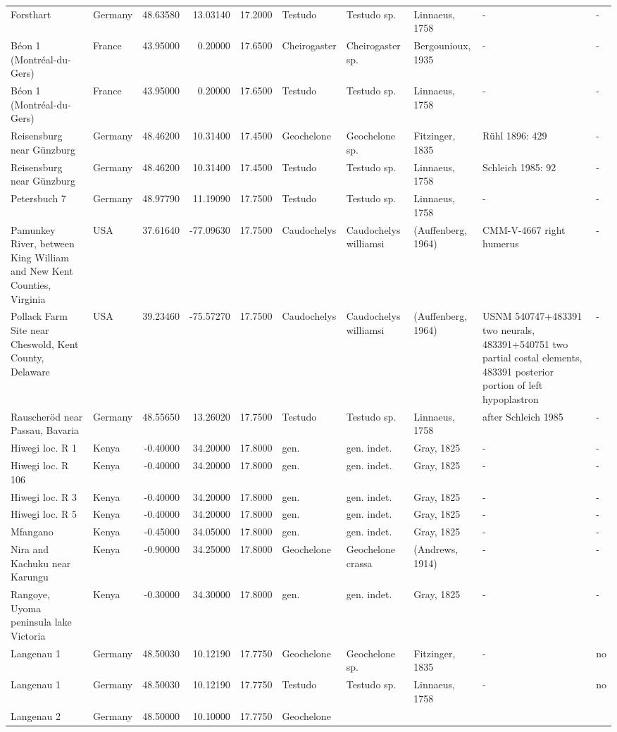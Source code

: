 \documentclass[]{article}
\begin{document}
\begin{longtable}[]{@{}llrrrlllll@{}}
Forsthart & Germany & 48.63580 & 13.03140 & 17.2000 & Testudo & Testudo
sp. & Linnaeus, 1758 & - & -\tabularnewline
Béon 1 (Montréal-du-Gers) & France & 43.95000 & 0.20000 & 17.6500 &
Cheirogaster & Cheirogaster sp. & Bergounioux, 1935 & - &
-\tabularnewline
Béon 1 (Montréal-du-Gers) & France & 43.95000 & 0.20000 & 17.6500 &
Testudo & Testudo sp. & Linnaeus, 1758 & - & -\tabularnewline
Reisensburg near Günzburg & Germany & 48.46200 & 10.31400 & 17.4500 &
Geochelone & Geochelone sp. & Fitzinger, 1835 & Rühl 1896: 429 &
-\tabularnewline
Reisensburg near Günzburg & Germany & 48.46200 & 10.31400 & 17.4500 &
Testudo & Testudo sp. & Linnaeus, 1758 & Schleich 1985: 92 &
-\tabularnewline
Petersbuch 7 & Germany & 48.97790 & 11.19090 & 17.7500 & Testudo &
Testudo sp. & Linnaeus, 1758 & - & -\tabularnewline
Pamunkey River, between King William and New Kent Counties, Virginia &
USA & 37.61640 & -77.09630 & 17.7500 & Caudochelys & Caudochelys
williamsi & (Auffenberg, 1964) & CMM-V-4667 right humerus &
-\tabularnewline
Pollack Farm Site near Cheswold, Kent County, Delaware & USA & 39.23460
& -75.57270 & 17.7500 & Caudochelys & Caudochelys williamsi &
(Auffenberg, 1964) & USNM 540747+483391 two neurals, 483391+540751 two
partial costal elements, 483391 posterior portion of left hypoplastron &
-\tabularnewline
Rauscheröd near Passau, Bavaria & Germany & 48.55650 & 13.26020 &
17.7500 & Testudo & Testudo sp. & Linnaeus, 1758 & after Schleich 1985 &
-\tabularnewline
Hiwegi loc. R 1 & Kenya & -0.40000 & 34.20000 & 17.8000 & gen. & gen.
indet. & Gray, 1825 & - & -\tabularnewline
Hiwegi loc. R 106 & Kenya & -0.40000 & 34.20000 & 17.8000 & gen. & gen.
indet. & Gray, 1825 & - & -\tabularnewline
Hiwegi loc. R 3 & Kenya & -0.40000 & 34.20000 & 17.8000 & gen. & gen.
indet. & Gray, 1825 & - & -\tabularnewline
Hiwegi loc. R 5 & Kenya & -0.40000 & 34.20000 & 17.8000 & gen. & gen.
indet. & Gray, 1825 & - & -\tabularnewline
Mfangano & Kenya & -0.45000 & 34.05000 & 17.8000 & gen. & gen. indet. &
Gray, 1825 & - & -\tabularnewline
Nira and Kachuku near Karungu & Kenya & -0.90000 & 34.25000 & 17.8000 &
Geochelone & Geochelone crassa & (Andrews, 1914) & - & -\tabularnewline
Rangoye, Uyoma peninsula lake Victoria & Kenya & -0.30000 & 34.30000 &
17.8000 & gen. & gen. indet. & Gray, 1825 & - & -\tabularnewline
Langenau 1 & Germany & 48.50030 & 10.12190 & 17.7750 & Geochelone &
Geochelone sp. & Fitzinger, 1835 & - & no\tabularnewline
Langenau 1 & Germany & 48.50030 & 10.12190 & 17.7750 & Testudo & Testudo
sp. & Linnaeus, 1758 & - & no\tabularnewline
Langenau 2 & Germany & 48.50000 & 10.10000 & 17.7750 & Geochelone &

\end{longtable}
\end{document}
